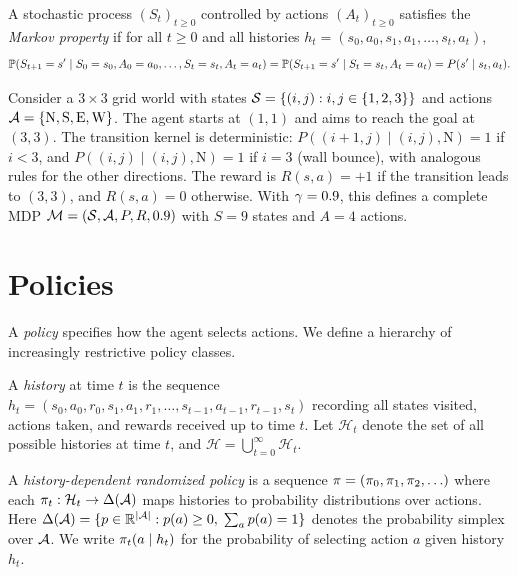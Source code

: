 \documentclass[11pt,a4paper]{article}
\begin{document}
\begin{definition}
\label{def:markov-property}
A stochastic process $(S_t)_{t \geq 0}$ controlled by actions
$(A_t)_{t \geq 0}$ satisfies the \emph{Markov property} if for all
$t \geq 0$ and all histories
$h_t = (s_0, a_0, s_1, a_1, \ldots, s_t, a_t)$,
\[
    \mathbb{P}(S_{t+1} = s' \mid S_0 = s_0, A_0 = a_0, \ldots, S_t = s_t,
    A_t = a_t) = \mathbb{P}(S_{t+1} = s' \mid S_t = s_t, A_t = a_t)
    = P(s' \mid s_t, a_t).
\]
\end{definition}

\begin{example}
\label{ex:gridworld}
Consider a $3 \times 3$ grid world with states
$\mathcal{S} = \{(i,j) : i,j \in \{1,2,3\}\}$ and actions
$\mathcal{A} = \{\text{N}, \text{S}, \text{E}, \text{W}\}$. The agent
starts at $(1,1)$ and aims to reach the goal at $(3,3)$. The
transition kernel is deterministic:
$P((i+1,j) \mid (i,j), \text{N}) = 1$ if $i < 3$, and
$P((i,j) \mid (i,j), \text{N}) = 1$ if $i = 3$ (wall bounce),
with analogous rules for the other directions. The reward is
$R(s,a) = +1$ if the transition leads to $(3,3)$, and $R(s,a) = 0$
otherwise. With $\gamma = 0.9$, this defines a complete MDP
$\mathcal{M} = (\mathcal{S}, \mathcal{A}, P, R, 0.9)$ with $S = 9$ states
and $A = 4$ actions.
\end{example}


\section{Policies}
\label{sec:policies}

A \emph{policy} specifies how the agent selects actions. We define a
hierarchy of increasingly restrictive policy classes.

\begin{definition}[History]
\label{def:history}
A \emph{history} at time $t$ is the sequence
$h_t = (s_0, a_0, r_0, s_1, a_1, r_1, \ldots, s_{t-1}, a_{t-1},
r_{t-1}, s_t)$ recording all states visited, actions taken, and
rewards received up to time $t$. Let $\mathcal{H}_t$ denote the set
of all possible histories at time $t$, and
$\mathcal{H} = \bigcup_{t=0}^{\infty} \mathcal{H}_t$.
\end{definition}

\begin{definition}
\label{def:hd-policy}
A \emph{history-dependent randomized policy} is a sequence
$\pi = (\pi_0, \pi_1, \pi_2, \ldots)$ where each
$\pi_t : \mathcal{H}_t \to \Delta(\mathcal{A})$ maps histories to
probability distributions over actions. Here
$\Delta(\mathcal{A}) = \{p \in \mathbb{R}^{|\mathcal{A}|} : p(a) \geq 0,\;
\sum_a p(a) = 1\}$ denotes the probability simplex over $\mathcal{A}$.
We write $\pi_t(a \mid h_t)$ for the probability of selecting
action $a$ given history $h_t$.
\end{definition}
\end{document}
